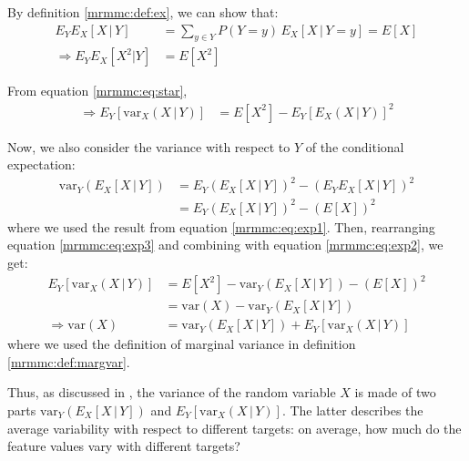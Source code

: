 \documentclass[12pt, twoside, a4paper]{report}
\def\var{\text{var}}
\begin{document}
By definition \ref{mrmmc:def:ex}, we can show that:
\begin{align}
E_YE_X[X \, | \, Y] &= \sum_{y \in Y} P(Y=y) \, E_X[X \, | \, Y=y] = E[X] \label{mrmmc:eq:exp1} \\
\Rightarrow E_YE_X[X^2|Y] &= E[X^2] \nonumber
\end{align}

From equation \ref{mrmmc:eq:star},
\begin{align}
\Rightarrow E_Y [ \var_X(X \, | \, Y) ] &= E[X^2] - E_Y [ E_X(X\,|\,Y) ] ^2 \label{mrmmc:eq:exp2}
\end{align}

Now, we also consider the variance with respect to $Y$ of the conditional expectation:
\begin{align}
\var_Y (E_X[X \, | \, Y]) &= E_Y \left( E_X[X \, | \, Y]\right)^2 - \left( E_YE_X[X \, | \, Y] \right)^2 \nonumber \\
&= E_Y \left( E_X[X \, | \, Y]\right)^2 - \left( E[X] \right)^2 \label{mrmmc:eq:exp3}
\end{align}
where we used the result from equation \ref{mrmmc:eq:exp1}. Then, rearranging equation \ref{mrmmc:eq:exp3} and combining with equation \ref{mrmmc:eq:exp2}, we get:
\begin{align*}
E_Y [ \var_X(X \, | \, Y) ] &= E[X^2] - \var_Y (E_X[X \, | \, Y]) - \left( E[X] \right)^2 \\
&= \var(X) - \var_Y (E_X[X \, | \, Y]) \\
\Rightarrow \var(X) &= \var_Y (E_X[X \, | \, Y]) + E_Y [ \var_X(X \, | \, Y) ]
\end{align*}
where we used the definition of marginal variance in definition \ref{mrmmc:def:margvar}.

Thus, as discussed in \cite{RefWorks:187}, the variance of the random variable $X$ is made of two parts $\var_Y (E_X[X \, | \, Y])$ and $E_Y [ \var_X(X \, | \, Y) ]$. The latter describes the average variability with respect to different targets: on average, how much do the feature values vary with different targets?

  
\end{document}
